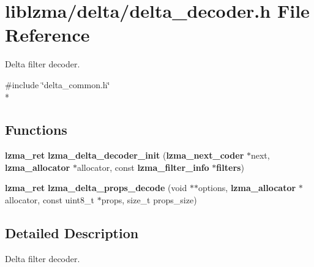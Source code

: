 \section{liblzma/delta/delta\-\_\-decoder.h File Reference}
\label{delta__decoder_8h}


Delta filter decoder.  


{\ttfamily \#include \char`\"{}delta\-\_\-common.\-h\char`\"{}}\\*
\subsection*{Functions}
\begin{DoxyCompactItemize}
\item 
{\bf lzma\-\_\-ret} {\bfseries lzma\-\_\-delta\-\_\-decoder\-\_\-init} ({\bf lzma\-\_\-next\-\_\-coder} $\ast$next, {\bf lzma\-\_\-allocator} $\ast$allocator, const {\bf lzma\-\_\-filter\-\_\-info} $\ast${\bf filters})\label{delta__decoder_8h_a642840eca8bd7b718484489f5a12d2b7}

\item 
{\bf lzma\-\_\-ret} {\bfseries lzma\-\_\-delta\-\_\-props\-\_\-decode} (void $\ast$$\ast$options, {\bf lzma\-\_\-allocator} $\ast$allocator, const uint8\-\_\-t $\ast$props, size\-\_\-t props\-\_\-size)\label{delta__decoder_8h_a320310c36c7aacae2f05e27a27ad0e7c}

\end{DoxyCompactItemize}


\subsection{Detailed Description}
Delta filter decoder. 